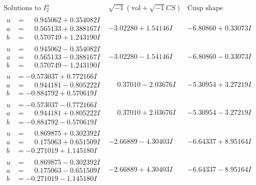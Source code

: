 \documentclass[1p]{elsarticle_modified}
\theoremstyle{definition}
\newcommand{\I}{\sqrt{-1}}
\begin{document}
$$\begin{array}{c|c|c}  
\text{Solutions to }I^u_{2}& \I (\text{vol} + \sqrt{-1}CS) & \text{Cusp shape}\\
 \hline 
\begin{aligned}
u &= \phantom{-}0.945062 + 0.354082 I \\
a &= \phantom{-}0.565133 + 0.388167 I \\
b &= \phantom{-}0.570749 + 1.243190 I\end{aligned}
 & -3.02280 + 1.54146 I & -6.80860 + 0.33073 I \\ \hline\begin{aligned}
u &= \phantom{-}0.945062 - 0.354082 I \\
a &= \phantom{-}0.565133 - 0.388167 I \\
b &= \phantom{-}0.570749 - 1.243190 I\end{aligned}
 & -3.02280 - 1.54146 I & -6.80860 - 0.33073 I \\ \hline\begin{aligned}
u &= -0.573037 + 0.772166 I \\
a &= \phantom{-}0.944181 - 0.805222 I \\
b &= -0.884792 + 0.570619 I\end{aligned}
 & \phantom{-}0.37010 - 2.03676 I & -5.30954 + 3.27219 I \\ \hline\begin{aligned}
u &= -0.573037 - 0.772166 I \\
a &= \phantom{-}0.944181 + 0.805222 I \\
b &= -0.884792 - 0.570619 I\end{aligned}
 & \phantom{-}0.37010 + 2.03676 I & -5.30954 - 3.27219 I \\ \hline\begin{aligned}
u &= \phantom{-}0.869875 + 0.302392 I \\
a &= \phantom{-}0.175063 + 0.651509 I \\
b &= -0.271019 + 1.145180 I\end{aligned}
 & -2.66889 - 4.30403 I & -6.64337 + 8.95164 I \\ \hline\begin{aligned}
u &= \phantom{-}0.869875 - 0.302392 I \\
a &= \phantom{-}0.175063 - 0.651509 I \\
b &= -0.271019 - 1.145180 I\end{aligned}
 & -2.66889 + 4.30403 I & -6.64337 - 8.95164 I \\ \hline\begin{aligned}

\end{aligned}
\end{array}$$
\end{document}

